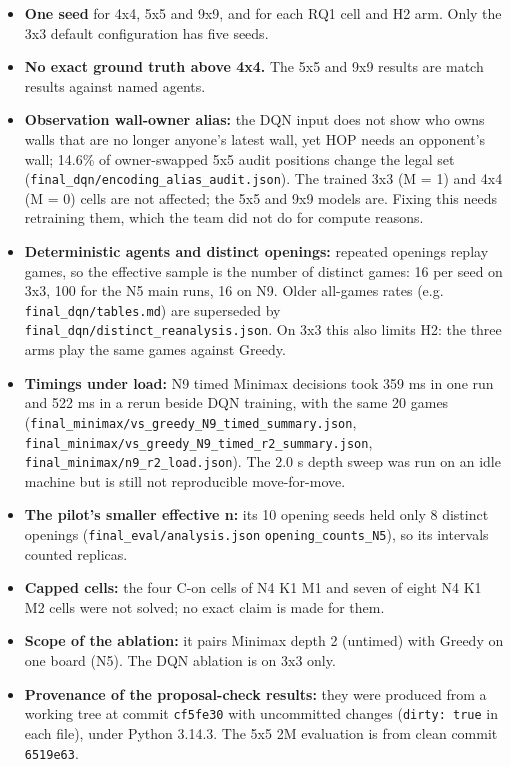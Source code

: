 \documentclass[11pt]{article}
\begin{document}
\begin{itemize}
\item \textbf{One seed} for 4x4, 5x5 and 9x9, and for each RQ1 cell and H2 arm. Only the 3x3 default
configuration has five seeds.
\item \textbf{No exact ground truth above 4x4.} The 5x5 and 9x9 results are match results against named
agents.
\item \textbf{Observation wall-owner alias:} the DQN input does not show who owns walls that are no longer
anyone's latest wall, yet HOP needs an opponent's wall; 14.6\% of owner-swapped 5x5 audit
positions change the legal set (\texttt{final\_dqn/encoding\_alias\_audit.json}). The trained 3x3 (M = 1)
and 4x4 (M = 0) cells are not affected; the 5x5 and 9x9 models are. Fixing this needs retraining
them, which the team did not do for compute reasons.
\item \textbf{Deterministic agents and distinct openings:} repeated openings replay games, so the
effective sample is the number of distinct games: 16 per seed on 3x3, 100 for the N5 main runs,
16 on N9. Older all-games rates (e.g. \texttt{final\_dqn/tables.md}) are superseded by
\texttt{final\_dqn/distinct\_reanalysis.json}. On 3x3 this also limits H2: the three arms play the same
games against Greedy.
\item \textbf{Timings under load:} N9 timed Minimax decisions took 359 ms in one run and 522 ms in a rerun
beside DQN training, with the same 20 games (\texttt{final\_minimax/vs\_greedy\_N9\_timed\_summary.json},
\texttt{final\_minimax/vs\_greedy\_N9\_timed\_r2\_summary.json}, \texttt{final\_minimax/n9\_r2\_load.json}). The 2.0 s
depth sweep was run on an idle machine but is still not reproducible move-for-move.
\item \textbf{The pilot's smaller effective n:} its 10 opening seeds held only 8 distinct openings
(\texttt{final\_eval/analysis.json} \texttt{opening\_counts\_N5}), so its intervals counted replicas.
\item \textbf{Capped cells:} the four C-on cells of N4 K1 M1 and seven of eight N4 K1 M2 cells were not
solved; no exact claim is made for them.
\item \textbf{Scope of the ablation:} it pairs Minimax depth 2 (untimed) with Greedy on one board (N5).
The DQN ablation is on 3x3 only.
\item \textbf{Provenance of the proposal-check results:} they were produced from a working tree at
commit \texttt{cf5fe30} with uncommitted changes (\texttt{dirty: true} in each file), under Python 3.14.3.
The 5x5 2M evaluation is from clean commit \texttt{6519e63}.
\end{itemize}
\end{document}

